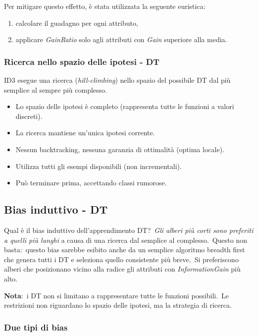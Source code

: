 \noindent Per mitigare questo effetto, è stata utilizzata la seguente euristica:
\begin{enumerate}
	\item calcolare il guadagno per ogni attributo,
	\item applicare \textit{GainRatio} solo agli attributi con \textit{Gain} superiore alla media.
\end{enumerate}

\subsubsection{Ricerca nello spazio delle ipotesi - DT}

ID3 esegue una ricerca (\textit{hill-climbing}) nello spazio del possibile DT dal più semplice al sempre più complesso.\
\begin{itemize}
	\item Lo spazio delle ipotesi è completo (rappresenta tutte le funzioni a valori discreti).
	\item La ricerca mantiene un'unica ipotesi corrente.
	\item Nessun backtracking, nessuna garanzia di ottimalità (optima locale).
	\item Utilizza tutti gli esempi disponibili (non incrementali).
	\item Può terminare prima, accettando classi rumorose.
\end{itemize}

\subsection{Bias induttivo - DT}

Qual è il bias induttivo dell'apprendimento DT?\
\textit{Gli alberi più corti sono preferiti a quelli più lunghi} a causa di una ricerca dal semplice al complesso.\
Questo non basta:\ questo bias sarebbe esibito anche da un semplice algoritmo breadth first che genera tutti i DT e seleziona quello consistente più breve.\
Si preferiscono alberi che posizionano vicino alla radice gli attributi con \textit{InformationGain} più alto.\

\textbf{Nota}:\ i DT non si limitano a rappresentare tutte le funzioni possibili.\
Le restrizioni non riguardano lo spazio delle ipotesi, ma la strategia di ricerca.

\subsubsection{Due tipi di bias}


